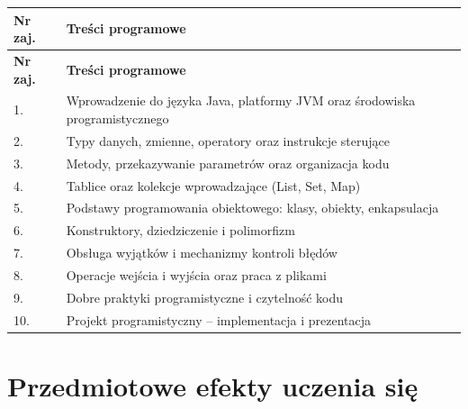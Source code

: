 \documentclass[12pt, a4paper]{article}
\newcommand{\thdrule}{\noalign{\global\setlength{\extrarowheight}{0pt}}}
\newcommand{\thdend}{\noalign{\global\setlength{\extrarowheight}{3pt}}}
\begin{document}
{\scriptsize
\begin{longtable}{m{1.5cm}m{14.5cm}}
\thdrule\toprule
\rowcolor{pjatkRed} {\color{white}\textbf{Nr zaj.}} & {\color{white}\textbf{Treści programowe}} \\
\midrule\thdend
\endfirsthead
\thdrule\toprule
\rowcolor{pjatkRed} {\color{white}\textbf{Nr zaj.}} & {\color{white}\textbf{Treści programowe}} \\
\midrule\thdend
\endhead
  \rowcolor{tableRowLight} 1. & Wprowadzenie do języka Java, platformy JVM oraz środowiska programistycznego \\
  \rowcolor{tableRowAlt} 2. & Typy danych, zmienne, operatory oraz instrukcje sterujące \\
  \rowcolor{tableRowLight} 3. & Metody, przekazywanie parametrów oraz organizacja kodu \\
  \rowcolor{tableRowAlt} 4. & Tablice oraz kolekcje wprowadzające (List, Set, Map) \\
  \rowcolor{tableRowLight} 5. & Podstawy programowania obiektowego: klasy, obiekty, enkapsulacja \\
  \rowcolor{tableRowAlt} 6. & Konstruktory, dziedziczenie i polimorfizm \\
  \rowcolor{tableRowLight} 7. & Obsługa wyjątków i mechanizmy kontroli błędów \\
  \rowcolor{tableRowAlt} 8. & Operacje wejścia i wyjścia oraz praca z plikami \\
  \rowcolor{tableRowLight} 9. & Dobre praktyki programistyczne i czytelność kodu \\
  \rowcolor{tableRowAlt} 10. & Projekt programistyczny – implementacja i prezentacja \\
\bottomrule
\end{longtable}}

\section{Przedmiotowe efekty uczenia się}
\end{document}
